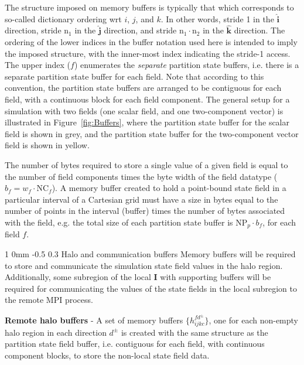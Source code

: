 \documentclass[11pt]{article}
\makeatletter
\renewcommand{\subsubsection}{\@startsection
{subsubsection}%
{1}%
{0mm}%
{-0.5\baselineskip}%
{0.3\baselineskip}%
{\normalfont\normalsize\itshape\centering\color{myBrown}}}%
\makeatother
\begin{document}
The structure imposed on memory buffers is typically that which corresponds to so-called dictionary ordering wrt $i$, $j$, and $k$. In other words, stride 1 in the $\mathbf{\hat{i}}$ direction, stride $\text{n}_1$ in the $\mathbf{\hat{j}}$ direction, and stride $\text{n}_1 \cdot \text{n}_2$ in the $\mathbf{\hat{k}}$ direction. The ordering of the lower indices in the buffer notation used here is intended to imply the imposed structure, with the inner-most index indicating the stride-1 access.  The upper index ($f$) enumerates the \textit{separate} partition state buffers, i.e. there is a separate partition state buffer for each field.  Note that according to this convention, the partition state buffers are arranged to be contiguous for each field, with a continuous block for each field component.  The general setup for a simulation with two fields (one scalar field, and one two-component vector) is illustrated in Figure~\ref{fig:Buffers}, where the partition state buffer for the scalar field is shown in grey, and the partition state buffer for the two-component vector field is shown in yellow.
 
The number of bytes required to store a single value of a given field is equal to the number of field components times the byte width of the field datatype ($b_f = w_f\cdot\text{NC}_f$). A memory buffer created to hold a point-bound state field in a particular interval of a Cartesian grid must have a size in bytes equal to the number of points in the interval (buffer) times the number of bytes associated with the field, e.g. the total size of each partition state buffer is $\text{NP}_p \cdot b_f$, for each field $f$. 

\subsubsection{Halo and communication buffers}
  Memory buffers will be required to store and communicate the simulation state field values in the halo region. Additionally, some subregion of the local $\textbf{I}$ with supporting buffers will be required for communicating the values of the state fields in the local subregion to the remote MPI process.


\textbf{Remote halo buffers} - A set of memory buffers $\{h^{f d^{\pm}}_{ijkc}\}$, one for each non-empty halo region in each direction $d^\pm$ is created with the same structure as the partition state field buffer, i.e. contiguous for each field, with continuous component blocks, to store the non-local state field data. 
\end{document}
